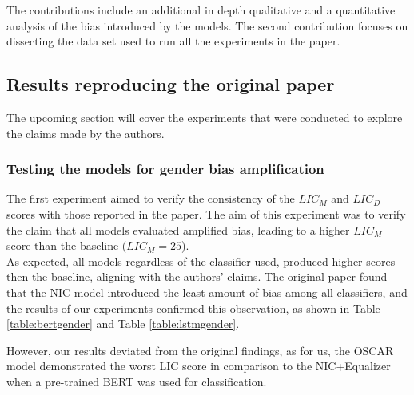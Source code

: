 The contributions include an additional in depth qualitative and a quantitative analysis of the bias introduced by the models. The second contribution focuses on dissecting the data set used to run all the experiments in the paper.


\subsection{Results reproducing the original paper}
The upcoming section will cover the experiments that were conducted to explore the claims made by the authors.


\begin{comment}
For each experiment, say 1) which claim in Section~\ref{sec:claims} it supports, and 2) if it successfully reproduced the associated experiment in the original paper. 
For example, an experiment training and evaluating a model on a dataset may support a claim that that model outperforms some baseline.
Logically group related results into sections. 
\end{comment}

\subsubsection{Testing the models for gender bias amplification}

The first experiment aimed to verify the consistency of the $LIC_M$ and $LIC_D$ 
scores with those reported in the paper. The aim of this experiment was to verify the
claim that all models evaluated amplified bias, leading to a higher $LIC_M$ score than the baseline ($LIC_M = 25$).\\

As expected, all models regardless of the classifier used, produced higher 
scores then the baseline, aligning with the authors' claims.
The original paper found that the NIC model introduced the least amount of 
bias among all classifiers, and the results of our experiments confirmed 
this observation, as shown in Table \ref{table:bertgender} and Table 
\ref{table:lstmgender}.

However, our results deviated from the original findings, as for us, the 
OSCAR model demonstrated the worst LIC score in comparison to the 
NIC+Equalizer when a pre-trained BERT was used for classification. 



